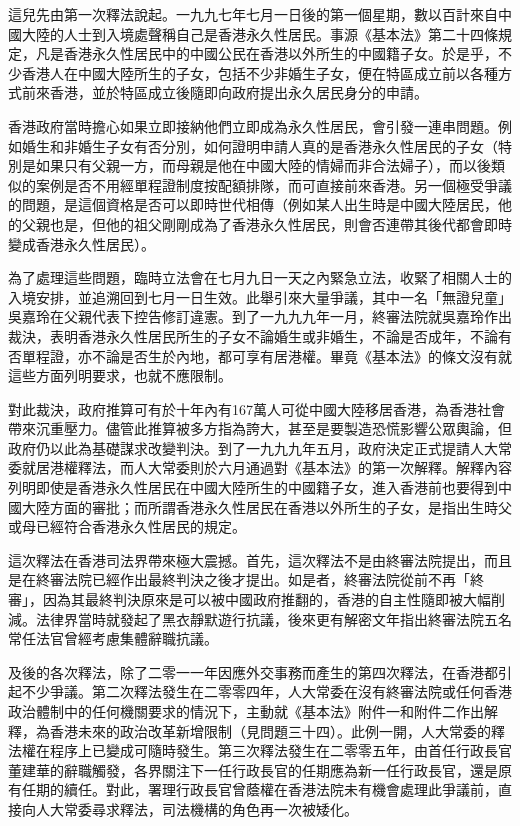 這兒先由第一次釋法說起。一九九七年七月一日後的第一個星期，數以百計來自中國大陸的人士到入境處聲稱自己是香港永久性居民。事源《基本法》第二十四條規定，凡是香港永久性居民中的中國公民在香港以外所生的中國籍子女。於是乎，不少香港人在中國大陸所生的子女，包括不少非婚生子女，便在特區成立前以各種方式前來香港，並於特區成立後隨即向政府提出永久居民身分的申請。

香港政府當時擔心如果立即接納他們立即成為永久性居民，會引發一連串問題。例如婚生和非婚生子女有否分別，如何證明申請人真的是香港永久性居民的子女（特別是如果只有父親一方，而母親是他在中國大陸的情婦而非合法婦子），而以後類似的案例是否不用經單程證制度按配額排隊，而可直接前來香港。另一個極受爭議的問題，是這個資格是否可以即時世代相傳（例如某人出生時是中國大陸居民，他的父親也是，但他的祖父剛剛成為了香港永久性居民，則會否連帶其後代都會即時變成香港永久性居民）。

為了處理這些問題，臨時立法會在七月九日一天之內緊急立法，收緊了相關人士的入境安排，並追溯回到七月一日生效。此舉引來大量爭議，其中一名「無證兒童」吳嘉玲在父親代表下控告修訂違憲。到了一九九九年一月，終審法院就吳嘉玲作出裁決，表明香港永久性居民所生的子女不論婚生或非婚生，不論是否成年，不論有否單程證，亦不論是否生於內地，都可享有居港權。畢竟《基本法》的條文沒有就這些方面列明要求，也就不應限制。

對此裁決，政府推算可有於十年內有167萬人可從中國大陸移居香港，為香港社會帶來沉重壓力。儘管此推算被多方指為誇大，甚至是要製造恐慌影響公眾輿論，但政府仍以此為基礎謀求改變判決。到了一九九九年五月，政府決定正式提請人大常委就居港權釋法，而人大常委則於六月通過對《基本法》的第一次解釋。解釋內容列明即使是香港永久性居民在中國大陸所生的中國籍子女，進入香港前也要得到中國大陸方面的審批；而所謂香港永久性居民在香港以外所生的子女，是指出生時父或母已經符合香港永久性居民的規定。

這次釋法在香港司法界帶來極大震撼。首先，這次釋法不是由終審法院提出，而且是在終審法院已經作出最終判決之後才提出。如是者，終審法院從前不再「終審」，因為其最終判決原來是可以被中國政府推翻的，香港的自主性隨即被大幅削減。法律界當時就發起了黑衣靜默遊行抗議，後來更有解密文年指出終審法院五名常任法官曾經考慮集體辭職抗議。

及後的各次釋法，除了二零一一年因應外交事務而產生的第四次釋法，在香港都引起不少爭議。第二次釋法發生在二零零四年，人大常委在沒有終審法院或任何香港政治體制中的任何機關要求的情況下，主動就《基本法》附件一和附件二作出解釋，為香港未來的政治改革新增限制（見問題三十四）。此例一開，人大常委的釋法權在程序上已變成可隨時發生。第三次釋法發生在二零零五年，由首任行政長官董建華的辭職觸發，各界關注下一任行政長官的任期應為新一任行政長官，還是原有任期的續任。對此，署理行政長官曾蔭權在香港法院未有機會處理此爭議前，直接向人大常委尋求釋法，司法機構的角色再一次被矮化。

